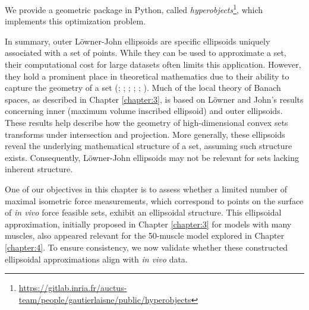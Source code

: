 We provide a geometric package in Python, called \emph{hyperobjects}\footnote{\url{https://gitlab.inria.fr/auctus-team/people/gautierlaisne/public/hyperobjects}}, which implements this optimization problem.

In summary, outer Löwner-John ellipsoids are specific ellipsoids uniquely associated with a set of points. While they can be used to approximate a set, their computational cost for large datasets often limits this application. However, they hold a prominent place in theoretical mathematics due to their ability to capture the geometry of a set (\cite{johnExtremumProblemsWithInequalities1948}; \cite{dvoretzkyTHEOREMCONVEXBODIES1961}; \cite{grunbaumProjectionConstants1960}; \cite{goffinRelationshipHausdorffDistance1983}; \cite{milmanDvoretzkyTheoremThirtyYearsLater1992}; \cite{henkLownerJohnEllipsoids2012}). Much of the local theory of Banach spaces, as described in Chapter \ref{chapter:3}, is based on Löwner and John's results concerning inner (maximum volume inscribed ellipsoid) and outer ellipsoids. These results help describe how the geometry of high-dimensional convex sets transforms under intersection and projection. More generally, these ellipsoids reveal the underlying mathematical structure of a set, assuming such structure exists. Consequently, Löwner-John ellipsoids may not be relevant for sets lacking inherent structure.

One of our objectives in this chapter is to assess whether a limited number of maximal isometric force measurements, which correspond to points on the surface of \emph{in vivo} force feasible sets, exhibit an ellipsoidal structure. This ellipsoidal approximation, initially proposed in Chapter \ref{chapter:3} for models with many muscles, also appeared relevant for the 50-muscle model explored in Chapter \ref{chapter:4}. To ensure consistency, we now validate whether these constructed ellipsoidal approximations align with \emph{in vivo} data.

